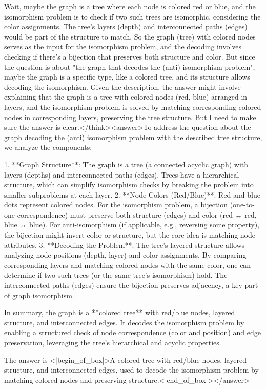 Wait, maybe the graph is a tree where each node is colored red or blue, and the isomorphism problem is to check if two such trees are isomorphic, considering the color assignments. The tree's layers (depth) and interconnected paths (edges) would be part of the structure to match. So the graph (tree) with colored nodes serves as the input for the isomorphism problem, and the decoding involves checking if there's a bijection that preserves both structure and color. But since the question is about "the graph that decodes the (anti) isomorphism problem", maybe the graph is a specific type, like a colored tree, and its structure allows decoding the isomorphism. Given the description, the answer might involve explaining that the graph is a tree with colored nodes (red, blue) arranged in layers, and the isomorphism problem is solved by matching corresponding colored nodes in corresponding layers, preserving the tree structure. But I need to make sure the answer is clear.</think><answer>To address the question about the graph decoding the (anti) isomorphism problem with the described tree structure, we analyze the components:  

1. **Graph Structure**: The graph is a tree (a connected acyclic graph) with layers (depths) and interconnected paths (edges). Trees have a hierarchical structure, which can simplify isomorphism checks by breaking the problem into smaller subproblems at each layer.  
2. **Node Colors (Red/Blue)**: Red and blue dots represent colored nodes. For the isomorphism problem, a bijection (one-to-one correspondence) must preserve both structure (edges) and color (red ↔ red, blue ↔ blue). For anti-isomorphism (if applicable, e.g., reversing some property), the bijection might invert color or structure, but the core idea is matching node attributes.  
3. **Decoding the Problem**: The tree’s layered structure allows analyzing node positions (depth, layer) and color assignments. By comparing corresponding layers and matching colored nodes with the same color, one can determine if two such trees (or the same tree’s isomorphism) hold. The interconnected paths (edges) ensure the bijection preserves adjacency, a key part of graph isomorphism.  

In summary, the graph is a **colored tree** with red/blue nodes, layered structure, and interconnected edges. It decodes the isomorphism problem by enabling a structured check of node correspondence (color and position) and edge preservation, leveraging the tree’s hierarchical and acyclic properties.  

The answer is <|begin_of_box|>A colored tree with red/blue nodes, layered structure, and interconnected edges, used to decode the isomorphism problem by matching colored nodes and preserving structure.<|end_of_box|></answer>